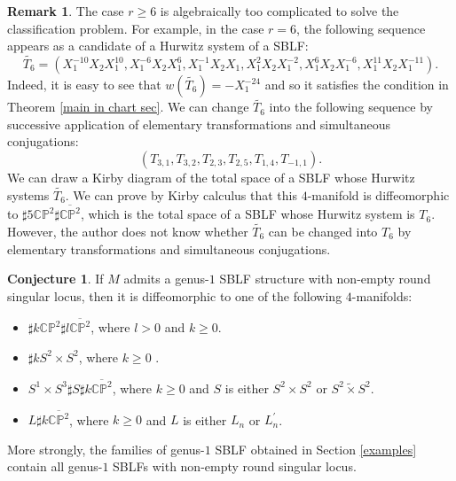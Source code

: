 \documentclass{amsart}
\theoremstyle{plain}
\theoremstyle{definition}
\newtheorem{conj}[thm]{Conjecture}
\newtheorem{rem}[thm]{Remark}
\begin{document}
\begin{rem}

The case $r\geq 6$ is algebraically too complicated to solve the classification problem. 
For example, in the case $r=6$, the following sequence appears as a candidate of a Hurwitz system of a SBLF: 
\[
\tilde{T_6}=(X_1^{-10}X_2X_1^{10},X_1^{-6}X_2X_1^{6},X_1^{-1}X_2X_1,X_1^{2}X_2X_1^{-2},X_1^{6}X_2X_1^{-6},X_1^{11}X_2X_1^{-11}). 
\]
Indeed, it is easy to see that $w(\tilde{T_6})=-X_1^{-24}$ and so it satisfies the condition in Theorem \ref{main in chart sec}. 
We can change $\tilde{T_6}$ into the following sequence by successive application of elementary transformations and simultaneous conjugations: 
\[
(T_{3,1},T_{3,2},T_{2,3},T_{2,5},T_{1,4},T_{-1,1}). 
\]
We can draw a Kirby diagram of the total space of a SBLF whose Hurwitz systems $\tilde{T_6}$. 
We can prove by Kirby calculus that this $4$-manifold is diffeomorphic to $\sharp 5\mathbb{CP}^2\sharp\overline{\mathbb{CP}^2}$, 
which is the total space of a SBLF whose Hurwitz system is $T_6$. 
However, the author does not know whether $\tilde{T_6}$ can be changed into $T_6$ by elementary transformations and simultaneous conjugations. 

\end{rem}

\begin{conj}

If $M$ admits a genus-$1$ SBLF structure with non-empty round singular locus, then it is diffeomorphic to one of the following $4$-manifolds: 

\begin{itemize}

\item $\sharp k\mathbb{CP}^2\sharp l\overline{\mathbb{CP}^2}$, where $l>0$ and $k\geq 0$. 

\item $\sharp kS^2\times S^2$, where $k\geq 0$ . 

\item $S^1\times S^3\sharp S\sharp k\overline{\mathbb{CP}^2}$, where $k\geq 0$ and $S$ is either $S^2\times S^2$ or $S^2\tilde{\times}S^2$. 

\item $L\sharp k\overline{\mathbb{CP}^2}$, where $k\geq 0$ and $L$ is either $L_n$ or $L_n^{\prime}$. 

\end{itemize}

More strongly, the families of genus-$1$ SBLF obtained in Section \ref{examples} contain all genus-$1$ SBLFs with non-empty round singular locus. 

\end{conj}
\end{document}
